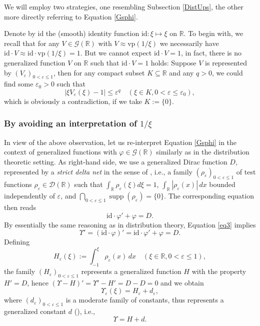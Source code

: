 \documentclass[sumlimits,intlimits,namelimits%
]{amsart}
\newcommand{\D}{\ensuremath{\mathcal{D}}}
\newcommand{\G}{\ensuremath{\mathcal{G}}}
\newcommand{\mb}[1]{\ensuremath{\mathbb{#1}}}
\newcommand{\R}{\mb{R}}
\newcommand{\vp}{\mathrm{vp}}
\theoremstyle{definition}
\newcommand{\beq}{\begin{equation}}
\newcommand{\eeq}{\end{equation}}
\newcommand{\col}{\colon}
\newcommand{\eps}{\varepsilon}
\newcommand{\vphi}{\varphi}
\newcommand{\supp}{\mathop{\mathrm{supp}}}
\begin{document}
We will employ two strategies, one resembling Subsection \ref{DistUps}, the other more directly referring to Equation \eqref{Gsphi}.

Denote by $\mathrm{id}$ the (smooth) identity function $\mathrm{id} \col \xi \mapsto \xi$ on $\R$. 
To begin with, we recall that for any $V \in \G(\R)$ with $V \approx \vp(1/\xi)$ we necessarily have $\mathrm{id} \cdot V \approx \mathrm{id} \cdot \vp(1/\xi) = 1$. But we cannot expect $\mathrm{id} \cdot V = 1$, in fact, there is no generalized function $V$ on $\R$ such that $\mathrm{id} \cdot V = 1$ holds: Suppose $V$ is represented by $(V_\eps)_{0 < \eps \leq 1}$, then for any compact subset $K \subseteq \R$ and any $q > 0$, we could find some $\eps_0 > 0$ such that 
$$
     |\xi V_\eps(\xi) - 1| \leq \eps^q \quad (\xi \in K, 0 < \eps \leq \eps_0),
$$
which is obviously a contradiction, if we take $K := \{ 0\}$.


\subsubsection{By avoiding an interpretation of $1/\xi$}


In view of the above observation, let us re-interpret Equation \eqref{Gsphi} in the context of generalized functions with $\vphi \in \G(\R)$ similarly as in the distribution theoretic setting. As right-hand side, we use a generalized Dirac function $D$,  represented by a \emph{strict delta net} in the sense of \cite[Definition 7.1]{O:92}, i.e., a family $(\rho_\eps)_{0 < \eps \leq 1}$ of test functions $\rho_\eps \in \D(\R)$ such that $\int_\R \rho_\eps(\xi) d \xi = 1$, $\int_\R |\rho_\eps(x)| \, dx$ bounded independently of $\eps$, and $\bigcap_{0 < \eps \leq 1} \supp(\rho_\eps) = \{0\}$. The corresponding equation then reads
\beq\label{eq3}
        \mathrm{id} \cdot \vphi' + \vphi = D.
\eeq
By essentially the same reasoning as in distribution theory, Equation \eqref{eq3} implies
$$
    \Upsilon' = (\mathrm{id} \cdot \vphi)' = \mathrm{id} \cdot \vphi' + \vphi = D.
$$
Defining
$$
  H_\eps(\xi) :=  \int_{-1}^\xi \rho_\eps(x) \, d x \quad (\xi \in \R, 0 < \eps \leq 1),
$$
the family $(H_\eps)_{0 < \eps \leq 1}$ represents a generalized function $H$ with the property $H' = D$, hence $(\Upsilon - H)' = \Upsilon' - H' = D - D = 0$ and we obtain
$$
    \Upsilon_\eps(\xi) = H_\eps + d_\eps,
$$
where $(d_\eps)_{0 < \eps \leq 1}$ is a moderate family of constants, thus represents a generalized constant $d$ (\cite[Proposition 1.2.35]{GKOS:01}), i.e.,
$$
   \Upsilon = H + d.
$$
\end{document}

